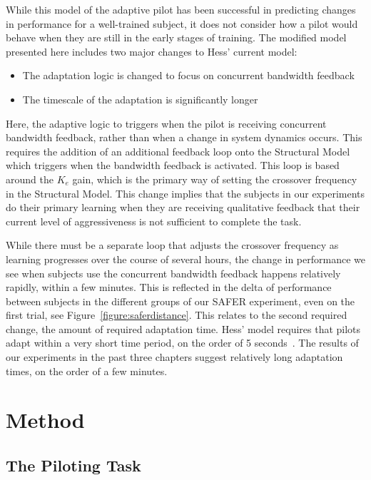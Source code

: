 While this model of the adaptive pilot has been successful in predicting changes in performance for a well-trained subject, it does not consider how a pilot would behave when they are still in the early stages of training.
The modified model presented here includes two major changes to Hess' current model:
\begin{itemize}
    \item The adaptation logic is changed to focus on concurrent bandwidth feedback
    \item The timescale of the adaptation is significantly longer
\end{itemize}

Here, the adaptive logic to triggers when the pilot is receiving concurrent bandwidth feedback, rather than when a change in system dynamics occurs.
This requires the addition of an additional feedback loop onto the Structural Model which triggers when the bandwidth feedback is activated.
This loop is based around the $K_e$ gain, which is the primary way of setting the crossover frequency in the Structural Model.
This change implies that the subjects in our experiments do their primary learning when they are receiving qualitative feedback that their current level of aggressiveness is not sufficient to complete the task.

While there must be a separate loop that adjusts the crossover frequency as learning progresses over the course of several hours, the change in performance we see when subjects use the concurrent bandwidth feedback happens relatively rapidly, within a few minutes.
This is reflected in the delta of performance between subjects in the different groups of our SAFER experiment, even on the first trial, see Figure~\ref{figure:saferdistance}.
This relates to the second required change, the amount of required adaptation time.
Hess' model requires that pilots adapt within a very short time period, on the order of 5 seconds~\citep{weir_model_1966}.
The results of our experiments in the past three chapters suggest relatively long adaptation times, on the order of a few minutes.

\section{Method}

\subsection{The Piloting Task}

